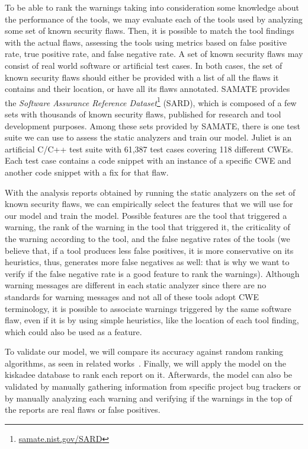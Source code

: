 To be able to rank the warnings taking into consideration some knowledge about
the performance of the tools, we may evaluate each of the tools used by
analyzing some set of known security flaws. Then, it is possible to match the
tool findings with the actual flaws, assessing the tools using metrics based on
false positive rate, true positive rate, and false negative rate. A set of
known security flaws may consist of real world software or artificial test
cases. In both cases, the set of known security flaws should either be provided
with a list of all the flaws it contains and their location, or have all its
flaws annotated. SAMATE provides the \textit{Software Assurance Reference
Dataset}\footnote{\url{samate.nist.gov/SARD}} (SARD), which is composed of a
few sets with thousands of known security flaws, published for research and
tool development purposes. Among these sets provided by SAMATE, there is one
test suite we can use to assess the static analyzers and train our model.
Juliet is an artificial C/C++ test suite with 61,387 test cases covering 118
different CWEs. Each test case contains a code snippet with an instance of a
specific CWE and another code snippet with a fix for that flaw.

With the analysis reports obtained by running the static analyzers on the set
of known security flaws, we can empirically select the features that we will
use for our model and train the model. Possible features are the tool that
triggered a warning, the rank of the warning in the tool that triggered it, the
criticality of the warning according to the tool, and the false negative rates
of the tools (we believe that, if a tool produces less false positives, it is
more conservative on its heuristics, thus, generates more false negatives as
well: that is why we want to verify if the false negative rate is a good
feature to rank the warnings). Although warning messages are different in each
static analyzer since there are no standards for warning messages and not all
of these tools adopt CWE terminology, it is possible to associate warnings
triggered by the same software flaw, even if it is by using simple heuristics,
like the location of each tool finding, which could also be used as a feature.

To validate our model, we will compare its accuracy against random ranking
algorithms, as seen in related works~\cite{kremenek2003z}.  Finally, we will apply
the model on the kiskadee database to rank each report on it. Afterwards, the model
can also be validated by manually gathering information from specific project
bug trackers or by manually analyzing each warning and verifying if the
warnings in the top of the reports are real flaws or false positives.

